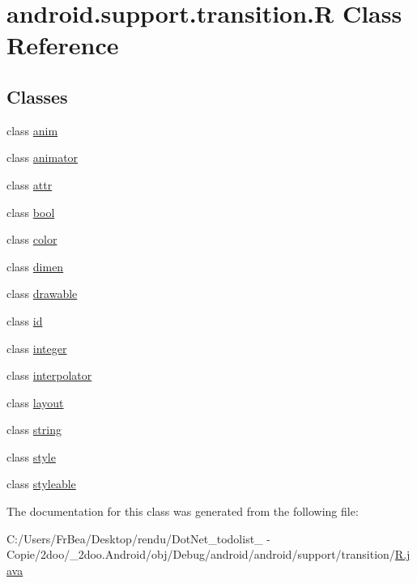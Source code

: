 \hypertarget{classandroid_1_1support_1_1transition_1_1_r}{
\section{android.support.transition.R Class Reference}
\label{classandroid_1_1support_1_1transition_1_1_r}
}
\subsection*{Classes}
\begin{CompactItemize}
\item 
class \hyperlink{classandroid_1_1support_1_1transition_1_1_r_1_1anim}{anim}
\item 
class \hyperlink{classandroid_1_1support_1_1transition_1_1_r_1_1animator}{animator}
\item 
class \hyperlink{classandroid_1_1support_1_1transition_1_1_r_1_1attr}{attr}
\item 
class \hyperlink{classandroid_1_1support_1_1transition_1_1_r_1_1bool}{bool}
\item 
class \hyperlink{classandroid_1_1support_1_1transition_1_1_r_1_1color}{color}
\item 
class \hyperlink{classandroid_1_1support_1_1transition_1_1_r_1_1dimen}{dimen}
\item 
class \hyperlink{classandroid_1_1support_1_1transition_1_1_r_1_1drawable}{drawable}
\item 
class \hyperlink{classandroid_1_1support_1_1transition_1_1_r_1_1id}{id}
\item 
class \hyperlink{classandroid_1_1support_1_1transition_1_1_r_1_1integer}{integer}
\item 
class \hyperlink{classandroid_1_1support_1_1transition_1_1_r_1_1interpolator}{interpolator}
\item 
class \hyperlink{classandroid_1_1support_1_1transition_1_1_r_1_1layout}{layout}
\item 
class \hyperlink{classandroid_1_1support_1_1transition_1_1_r_1_1string}{string}
\item 
class \hyperlink{classandroid_1_1support_1_1transition_1_1_r_1_1style}{style}
\item 
class \hyperlink{classandroid_1_1support_1_1transition_1_1_r_1_1styleable}{styleable}
\end{CompactItemize}


The documentation for this class was generated from the following file:\begin{CompactItemize}
\item 
C:/Users/FrBea/Desktop/rendu/DotNet\_\-todolist\_ - Copie/2doo/\_\-2doo.Android/obj/Debug/android/android/support/transition/\hyperlink{android_2support_2transition_2_r_8java}{R.java}\end{CompactItemize}
